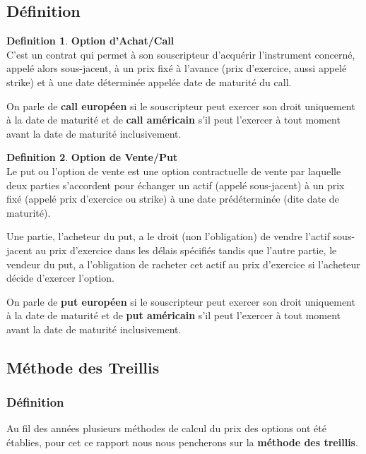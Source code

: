 \documentclass[12pt]{article}
\theoremstyle{definition}
\newtheorem{definition}{Definition}[section]
\theoremstyle{definition}
\begin{document}
\subsection{Définition}
\theoremstyle{definition}
\begin{definition}{ \textbf{Option d'Achat/Call}}
\\
C'est un contrat qui permet à son souscripteur d'acquérir l'instrument concerné, appelé alors sous-jacent, à un prix fixé à l'avance (prix d'exercice, aussi appelé strike) et à une date déterminée appelée date de maturité du call.
\end{definition}

On parle de \textbf{call européen} si le souscripteur peut exercer son droit uniquement à la date de maturité et de \textbf{call américain } s'il peut l'exercer à tout moment avant la date de maturité inclusivement.\\

\begin{definition}{ \textbf{Option de Vente/Put}}
\\
Le put ou l'option de vente est une option contractuelle de vente par laquelle deux parties s'accordent pour échanger un actif (appelé sous-jacent) à un prix fixé (appelé prix d'exercice ou strike) à une date prédéterminée (dite date de maturité). 

Une partie, l'acheteur du put, a le droit (non l'obligation) de vendre l'actif sous-jacent au prix d'exercice dans les délais spécifiés tandis que l'autre partie, le vendeur du put, a l'obligation de racheter cet actif au prix d'exercice si l'acheteur décide d'exercer l'option.
\end{definition}

On parle de \textbf{put européen } si le souscripteur peut exercer son droit uniquement à la date de maturité et de \textbf{put américain} s'il peut l'exercer à tout moment avant la date de maturité inclusivement.


\subsection{Méthode des Treillis}

\subsubsection{Définition}
Au fil des années plusieurs méthodes de calcul du prix des options ont été établies, pour cet ce rapport nous nous pencherons sur la \textbf{méthode des treillis}.
\end{document}

